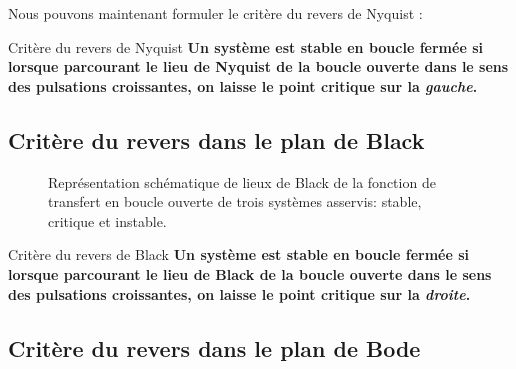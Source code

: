 Nous pouvons maintenant formuler le critère du revers de Nyquist :

\begin{criteria}{Critère du revers de Nyquist}
\textbf{Un système est stable en boucle fermée si lorsque parcourant 
        le lieu de Nyquist de la boucle ouverte dans le sens des 
        pulsations croissantes, on laisse le point critique sur la 
        \emph{gauche}.}
\end{criteria}

\newpage
\subsection{Critère du revers dans le plan de Black
}
\acpl
\begin{figure}[!h]
    \centering
    
    \caption{Représentation schématique de lieux de Black de la 
             fonction de transfert en boucle ouverte de trois systèmes 
             asservis: stable, critique et instable.
\label{fig-black_revers}}
\end{figure}

\begin{criteria}{Critère du revers de Black}
\textbf{Un système est stable en boucle fermée si lorsque parcourant 
        le lieu de Black de la boucle ouverte dans le sens des 
        pulsations croissantes, on laisse le point critique sur 
        la \emph{droite}.}
\end{criteria}
\newpage
\subsection{Critère du revers dans le plan de Bode
}

